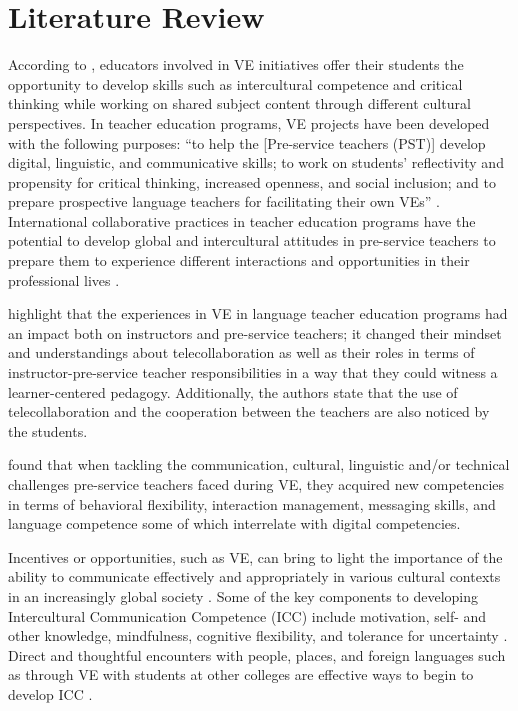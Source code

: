 \section{Literature Review}\label{sec-literaturereview}

According to \textcite{odowd2018telecollaboration}, educators involved in VE
initiatives offer their students the opportunity to develop skills such
as intercultural competence and critical thinking while working on
shared subject content through different cultural perspectives. In
teacher education programs, VE projects have been developed with the
following purposes: \enquote{to help the [Pre-service teachers (PST)]
develop digital, linguistic, and communicative skills; to work on
students' reflectivity and propensity for critical thinking, increased
openness, and social inclusion; and to prepare prospective language
teachers for facilitating their own VEs} \cite{grau2019experiential}.
International collaborative practices in teacher education programs have
the potential to develop global and intercultural attitudes in
pre-service teachers to prepare them to experience different
interactions and opportunities in their professional lives \cite{kopish2020leveraging}.
	
\textcite{sadler2016twelve} highlight that the experiences in VE in language
teacher education programs had an impact both on instructors and
pre-service teachers; it changed their mindset and understandings about
telecollaboration as well as their roles in terms of
instructor-pre-service teacher responsibilities in a way that they could
witness a learner-centered pedagogy. Additionally, the authors state
that the use of telecollaboration and the cooperation between the
teachers are also noticed by the students.
	
\textcite{hauck2019virtual} found that when tackling the communication, cultural,
linguistic and/or technical challenges pre-service teachers faced during
VE, they acquired new competencies in terms of behavioral flexibility,
interaction management, messaging skills, and language competence some
of which interrelate with digital competencies.
	
Incentives or opportunities, such as VE, can bring to light the
importance of the ability to communicate effectively and appropriately
in various cultural contexts in an increasingly global society
\cite{deardorff2020manual}. Some of the key components to developing
Intercultural Communication Competence (ICC) include motivation, self-
and other knowledge, mindfulness, cognitive flexibility, and tolerance
for uncertainty \cite{wilberschied_intercultural_2015}. Direct and thoughtful encounters with people, places, and foreign languages such as through VE with students at other colleges are effective ways to begin to develop ICC \cite{idris2019intercultural,lopez2017developing}.
	
